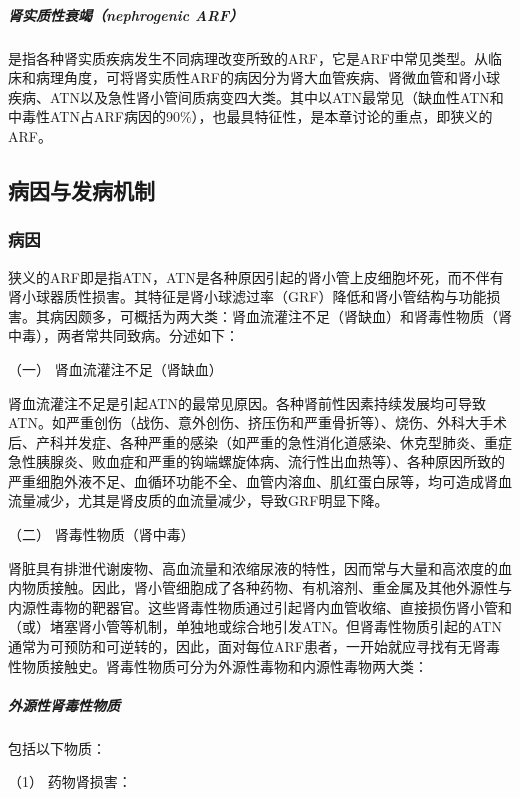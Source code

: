 \subparagraph{肾实质性衰竭（nephrogenic ARF）}

是指各种肾实质疾病发生不同病理改变所致的ARF，它是ARF中常见类型。从临床和病理角度，可将肾实质性ARF的病因分为肾大血管疾病、肾微血管和肾小球疾病、ATN以及急性肾小管间质病变四大类。其中以ATN最常见（缺血性ATN和中毒性ATN占ARF病因的90\%），也最具特征性，是本章讨论的重点，即狭义的ARF。

\subsection{病因与发病机制}

\subsubsection{病因}

狭义的ARF即是指ATN，ATN是各种原因引起的肾小管上皮细胞坏死，而不伴有肾小球器质性损害。其特征是肾小球滤过率（GRF）降低和肾小管结构与功能损害。其病因颇多，可概括为两大类：肾血流灌注不足（肾缺血）和肾毒性物质（肾中毒），两者常共同致病。分述如下：

\hypertarget{text00083.htmlux5cux23CHP3-7-4-1-1}{}
（一） 肾血流灌注不足（肾缺血）

肾血流灌注不足是引起ATN的最常见原因。各种肾前性因素持续发展均可导致ATN。如严重创伤（战伤、意外创伤、挤压伤和严重骨折等）、烧伤、外科大手术后、产科并发症、各种严重的感染（如严重的急性消化道感染、休克型肺炎、重症急性胰腺炎、败血症和严重的钩端螺旋体病、流行性出血热等）、各种原因所致的严重细胞外液不足、血循环功能不全、血管内溶血、肌红蛋白尿等，均可造成肾血流量减少，尤其是肾皮质的血流量减少，导致GRF明显下降。

\hypertarget{text00083.htmlux5cux23CHP3-7-4-1-2}{}
（二） 肾毒性物质（肾中毒）

肾脏具有排泄代谢废物、高血流量和浓缩尿液的特性，因而常与大量和高浓度的血内物质接触。因此，肾小管细胞成了各种药物、有机溶剂、重金属及其他外源性与内源性毒物的靶器官。这些肾毒性物质通过引起肾内血管收缩、直接损伤肾小管和（或）堵塞肾小管等机制，单独地或综合地引发ATN。但肾毒性物质引起的ATN通常为可预防和可逆转的，因此，面对每位ARF患者，一开始就应寻找有无肾毒性物质接触史。肾毒性物质可分为外源性毒物和内源性毒物两大类：

\subparagraph{外源性肾毒性物质}

包括以下物质：

\hypertarget{text00083.htmlux5cux23CHP3-7-4-1-2-1-1}{}
（1） 药物肾损害：


